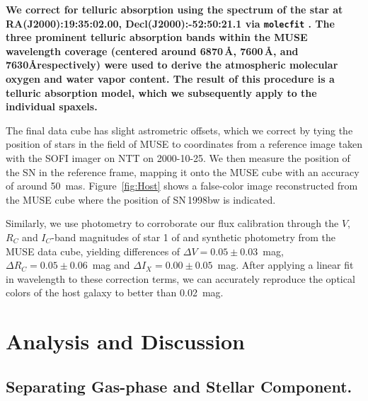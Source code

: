 \documentclass[traditabstract]{aa}
\begin{document}
\textbf{We correct for telluric absorption using the spectrum of the star at RA(J2000):19:35:02.00, Decl(J2000):-52:50:21.1 via \texttt{molecfit} \citep{2015A&A...576A..77S}. The three prominent telluric absorption bands within the MUSE wavelength coverage (centered around 6870\,\AA, 7600\,\AA, and 7630\AA respectively) were used to derive the atmospheric molecular oxygen and water vapor content. The result of this procedure is a telluric absorption model, which we subsequently apply to the individual spaxels.}

The final data cube has slight astrometric offsets, which we correct by tying the position of stars in the field of MUSE to coordinates from a reference image taken with the SOFI imager on NTT on 2000-10-25. We then measure the position of the SN in the reference frame, mapping it onto the MUSE cube with an accuracy of around 50~mas. Figure~\ref{fig:Host} shows a false-color image reconstructed from the MUSE cube where the position of SN\,1998bw is indicated.

Similarly, we use photometry to corroborate our flux calibration through the $V$, $R_C$ and $I_C$-band magnitudes of star 1 of \citet{2011AJ....141..163C} and synthetic photometry from the MUSE data cube, yielding differences of $\Delta V = 0.05\pm0.03$~mag, $\Delta R_C = 0.05\pm0.06$~mag and $\Delta I_X = 0.00\pm0.05$~mag. After applying a linear fit in wavelength to these correction terms, we can accurately reproduce the optical colors of the host galaxy \citep{2005NewA...11..103S} to better than 0.02~mag.

\section{Analysis and Discussion}

\subsection{Separating Gas-phase and Stellar Component.}
\label{sec:stargas}
\end{document}
